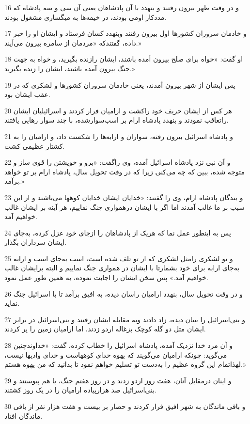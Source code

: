 \par 16 و در وقت ظهر بیرون رفتند و بنهدد با آن پادشاهان یعنی آن سی و سه پادشاه که مددکار اومی بودند، در خیمه‌ها به میگساری مشغول بودند.
\par 17 و خادمان سروران کشورها اول بیرون رفتند وبنهدد کسان فرستاد و ایشان او را خبر داده، گفتندکه «مردمان از سامره بیرون می‌آیند.»
\par 18 او گفت: «خواه برای صلح بیرون آمده باشند، ایشان رازنده بگیرید، و خواه به جهت جنگ بیرون آمده باشند، ایشان را زنده بگیرید.»
\par 19 پس ایشان از شهر بیرون آمدند، یعنی خادمان سروران کشورها و لشکری که در عقب ایشان بود.
\par 20 هر کس از ایشان حریف خود راکشت و ارامیان فرار کردند و اسرائیلیان ایشان راتعاقب نمودند و بنهدد پادشاه ارام بر اسب‌سوارشده، با چند سوار رهایی یافتند.
\par 21 و پادشاه اسرائیل بیرون رفته، سواران و ارابه‌ها را شکست داد، و ارامیان را به کشتار عظیمی کشت.
\par 22 و آن نبی نزد پادشاه اسرائیل آمده، وی راگفت: «برو و خویشتن را قوی ساز و متوجه شده، ببین که چه می‌کنی زیرا که در وقت تحویل سال، پادشاه ارام بر تو خواهد برآمد.»
\par 23 و بندگان پادشاه ارام، وی را گفتند: «خدایان ایشان خدایان کوهها می‌باشند و از این سبب بر ما غالب آمدند اما اگر با ایشان درهمواری جنگ نماییم، هر آینه بر ایشان غالب خواهیم آمد.
\par 24 پس به اینطور عمل نما که هریک از پادشاهان را ازجای خود عزل کرده، به‌جای ایشان سرداران بگذار.
\par 25 و تو لشکری رامثل لشکری که از تو تلف شده است، اسب به‌جای اسب و ارابه به‌جای ارابه برای خود بشمارتا با ایشان در همواری جنگ نماییم و البته برایشان غالب خواهیم آمد.» پس سخن ایشان را اجابت نموده، به همین طور عمل نمود.
\par 26 و در وقت تحویل سال، بنهدد ارامیان راسان دیده، به افیق برآمد تا با اسرائیل جنگ نماید.
\par 27 و بنی‌اسرائیل را سان دیده، زاد دادند وبه مقابله ایشان رفتند و بنی‌اسرائیل در برابر ایشان مثل دو گله کوچک بزغاله اردو زدند، اما ارامیان زمین را پر کردند.
\par 28 و آن مرد خدا نزدیک آمده، پادشاه اسرائیل را خطاب کرده، گفت: «خداوندچنین می‌گوید: چونکه ارامیان می‌گویند که یهوه خدای کوههاست و خدای وادیها نیست، لهذاتمام این گروه عظیم را به‌دست تو تسلیم خواهم نمود تا بدانید که من یهوه هستم.»
\par 29 و اینان درمقابل آنان، هفت روز اردو زدند و در روز هفتم جنگ، با هم پیوستند و بنی‌اسرائیل صد هزارپیاده ارامیان را در یک روز کشتند.
\par 30 و باقی ماندگان به شهر افیق فرار کردند و حصار بر بیست و هفت هزار نفر از باقی ماندگان افتاد.
